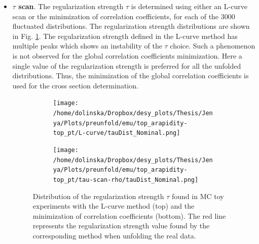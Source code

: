 \begin{itemize}

 \item \textbf{$\tau$ scan}. The regularization strength $\tau$ is determined using either an L-curve scan or the minimization of correlation coefficients, for each
 of the 3000 fluctuated distributions. The regularization strength distributions are shown in
 Fig. \ref{fig:tau_scan}. The regularization strength defined in the L-curve method has multiple peaks which shows an instability of the $\tau$ choice.
 Such a phenomenon is not observed for the global correlation coefficients minimization. Here a single value of the regularization strength
 is preferred for all the unfolded distributions. Thus, the minimization of the global correlation coefficients is used for the cross section determination.
 \begin{figure}[p]
 \centering
 \begin{subfigure}
  \centering
  \texttt{[image: /home/dolinska/Dropbox/desy\_plots/Thesis/Jenya/Plots/preunfold/emu/top\_arapidity-top\_pt/L-curve/tauDist\_Nominal.png]}
 \end{subfigure}
 \begin{subfigure}
  \centering
  \texttt{[image: /home/dolinska/Dropbox/desy\_plots/Thesis/Jenya/Plots/preunfold/emu/top\_arapidity-top\_pt/tau-scan-rho/tauDist\_Nominal.png]}
 \end{subfigure}
 \caption{Distribution of the regularization strength $\tau$ found in MC toy experiments with the L-curve method (top) and the minimization of correlation coefficients
         (bottom). The red line represents the regularization strength value found by the corresponding method when unfolding the real data.}
 \label{fig:tau_scan}
 \end{figure}
 

\end{itemize}
